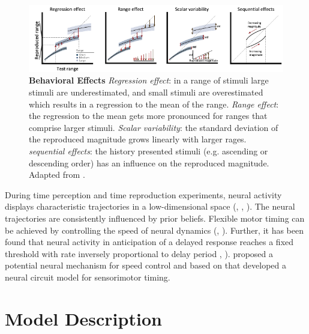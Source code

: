 \documentclass[9pt]{article}
\begin{document}
\begin{figure}[ht]
	\centering
	\includegraphics{figures/behavioural_effects_petzschner.pdf}
	\caption{\textbf{Behavioral Effects} 
	\textit{Regression effect}: in a range of stimuli large stimuli are underestimated, and small stimuli are overestimated which results in a regression to the mean of the range.
	\textit{Range effect}: the regression to the mean gets more pronounced for ranges that comprise larger stimuli. 
	\textit{Scalar variability}: the standard deviation of the reproduced magnitude grows linearly with larger rages. 
	\textit{sequential effects}: the history presented stimuli (e.g. ascending or descending order) has an influence on the reproduced magnitude. 
	Adapted from \cite{Petzschner2015}.}
	\label{fig:behavioraleffects}
\end{figure}

During time perception and time reproduction experiments, neural activity displays characteristic trajectories in a low-dimensional space (\cite{Meirhaeghe2021}, \cite{Wang2018}, \cite{Henke2021}). 
The neural trajectories are consistently influenced by prior beliefs. 
Flexible motor timing can be achieved by controlling the speed of neural dynamics (\cite{Sohn2019}, \cite{Wang2018}). 
Further, it has been found that neural activity in anticipation of a delayed response reaches a fixed threshold with rate inversely proportional to delay period \cite{Murakami2014}, \cite{Mita2009}).
\cite{Wang2018} proposed a potential neural mechanism for speed control and based on that \cite{Egger2020} developed a neural circuit model for sensorimotor timing.

\section{Model Description}
\end{document}
